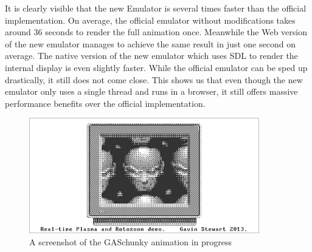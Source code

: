 It is clearly visible that the new Emulator is several times faster than the official implementation.
On average, the official emulator without modifications takes around 36 seconds to render the full animation once. Meanwhile the Web version of the new emulator manages to achieve the same result in just one second on average. The native version of the new emulator which uses SDL to render the internal display is even slightly faster. While the official emulator can be sped up drastically, it still does not come close.
This shows us that even though the new emulator only uses a single thread and runs in a browser, it still offers massive performance benefits over the official implementation.

\begin{center}
  \begin{figure}[ht]
    \centering
    \includegraphics[width=10cm]{fig/gaschunky.png}
    \caption{A screenshot of the GASchunky animation in progress}%
    \label{fig:gaschunky-screenshot}
  \end{figure}
\end{center}
